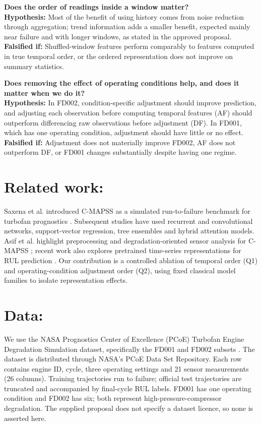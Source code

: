 \documentclass[10pt,a4paper]{article}
\begin{document}
\begin{description}[leftmargin=1.2em,style=nextline]
\item[Q1.] \textbf{Does the order of readings inside a window matter?}\\
\textbf{Hypothesis:} Most of the benefit of using history comes from noise reduction through aggregation; trend information adds a smaller benefit, expected mainly near failure and with longer windows, as stated in the approved proposal.\\
\textbf{Falsified if:} Shuffled-window features perform comparably to features computed in true temporal order, or the ordered representation does not improve on summary statistics.
\item[Q2.] \textbf{Does removing the effect of operating conditions help, and does it matter when we do it?}\\
\textbf{Hypothesis:} In FD002, condition-specific adjustment should improve prediction, and adjusting each observation before computing temporal features (AF) should outperform differencing raw observations before adjustment (DF). In FD001, which has one operating condition, adjustment should have little or no effect.\\
\textbf{Falsified if:} Adjustment does not materially improve FD002, AF does not outperform DF, or FD001 changes substantially despite having one regime.
\end{description}

\section{Related work:}
Saxena et al. introduced C-MAPSS as a simulated run-to-failure benchmark for turbofan prognostics \cite{saxena2008}. Subsequent studies have used recurrent and convolutional networks, support-vector regression, tree ensembles and hybrid attention models. Asif et al. highlight preprocessing and degradation-oriented sensor analysis for C-MAPSS \cite{asif2022}; recent work also explores pretrained time-series representations for RUL prediction \cite{dinten2025}. Our contribution is a controlled ablation of temporal order (Q1) and operating-condition adjustment order (Q2), using fixed classical model families to isolate representation effects.

\section{Data:}
We use the NASA Prognostics Center of Excellence (PCoE) Turbofan Engine Degradation Simulation dataset, specifically the FD001 and FD002 subsets \cite{cmapssdataset,saxena2008}. The dataset is distributed through NASA's PCoE Data Set Repository. Each row contains engine ID, cycle, three operating settings and 21 sensor measurements (26 columns). Training trajectories run to failure; official test trajectories are truncated and accompanied by final-cycle RUL labels. FD001 has one operating condition and FD002 has six; both represent high-pressure-compressor degradation. The supplied proposal does not specify a dataset licence, so none is asserted here.
\end{document}
